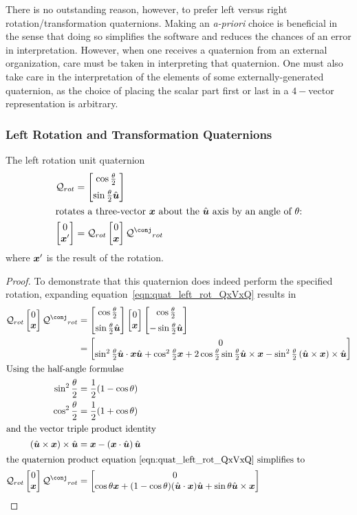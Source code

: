 There is no outstanding reason, however, to prefer left versus right
rotation/transformation quaternions. Making an \emph{a-priori} choice is
beneficial in the sense that doing so simplifies the software and reduces
the chances of an error in interpretation.
However, when one receives a quaternion from an external organization,
care must be taken in interpreting that quaternion. One must also take care
in the interpretation of the elements of some externally-generated quaternion,
as the choice of placing the scalar part first or last in a $4-$vector
representation is arbitrary.

\subsubsection{Left Rotation and Transformation Quaternions}

\begin{algorithm}\label{thm:quat_quat_left_rot}
The left rotation unit quaternion
\begin{align}
  \quat Q_{rot} &= \quatrrot{\theta}{\vhat u} \label{eqn:quat_left_rot_def} \\
\intertext{rotates a three-vector $\vect x$ about the $\vhat u$ axis %
           by an angle of $\theta$:}
  \quatsv 0 {\vect x^\prime} &=
    \QxVxQ{\quat Q_{rot}}{\vect x}{\quatconj Q_{rot}}
  \label{eqn:quat_left_rot_QxVxQ}
\end{align}
where $\boldsymbol{x}^\prime$ is the result of the rotation.
\end{algorithm}
\begin{proof}
To demonstrate that this quaternion does indeed perform the specified rotation,
expanding equation~\eqref{eqn:quat_left_rot_QxVxQ} results in
\begin{align*}
  \QxVxQ{\quat Q_{rot}}{\vect x}{\quatconj Q_{rot}} &=
   \QxVxQ{\quatrrot{\theta}{\vhat u}}{\vect x}{\quattrot{\theta}{\vhat u}} \\
   &=
   \quatsv
     0
     {\sin^2\frac\theta2 \vhat u \cdot \vect x \vhat u
      + \cos^2\frac\theta2 \vect x
      + 2 \cos\frac\theta2 \sin\frac\theta2 \vhat u \times \vect x
      - \sin^2\frac\theta2 \left(\vhat u \times \vect x\right)\times \vhat u} \\
\intertext{Using the half-angle formulae}
  \sin^2\frac\theta2 &= \frac 1 2 (1-\cos\theta) \\
  \cos^2\frac\theta2 &= \frac 1 2 (1+\cos\theta) \\
\intertext{and the vector triple product identity}
  \left(\vhat u \times \vect x\right) \times \vhat u
    &= \vect x - \left(\vect x \cdot \vhat u\right) \vhat u \\
\intertext{the quaternion product equation~\eqref{eqn:quat_left_rot_QxVxQ} %
           simplifies to}
   \QxVxQ{\quat Q_{rot}}{\vect x}{\quatconj Q_{rot}} &=
   \quatsv
     0
     {\cos\theta \vect x +
      (1-\cos\theta) (\vhat u \cdot \vect x) \vhat u +
      \sin\theta \vhat u \times \vect x}
\end{align*}
\end{proof}

